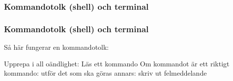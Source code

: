 




\begin{frame}[fragile]
    \frametitle{Kommandotolk (shell) och terminal}


    \halfblankline
    \begin{description}
    \end{description}

    \blankline

    \begin{itemize}
    \end{itemize}

\end{frame}

\begin{frame}[fragile]
    \frametitle{Kommandotolk (shell) och terminal}

    Så här fungerar en kommandotolk:
    \begin{GobbleCode}{4}
        Upprepa i all oändlighet:
        Läs ett kommando
        Om kommandot är ett riktigt kommando:
        utför det som ska göras
        annars:
        skriv ut felmeddelande
    \end{GobbleCode}

\end{frame}

